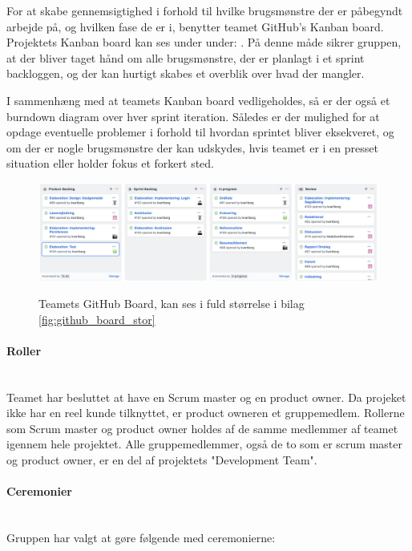 \documentclass[../../main.tex]{subfiles}
\begin{document}
For at skabe gennemsigtighed i forhold til hvilke brugsmønstre der er påbegyndt arbejde på, og hvilken fase de er i, benytter teamet GitHub's Kanban board. Projektets Kanban board kan ses under under: \cite{github}. 
På denne måde sikrer gruppen, at der bliver taget hånd om alle brugsmønstre, der er planlagt i et sprint backloggen, og der kan hurtigt skabes et overblik over hvad der mangler. 

I sammenhæng med at teamets Kanban board vedligeholdes, så er der også et burndown diagram over hver sprint iteration. Således er der mulighed for at opdage eventuelle problemer i forhold til hvordan sprintet bliver eksekveret, og om der er nogle brugsmønstre der kan udskydes, hvis teamet er i en presset situation eller holder fokus et forkert sted.
\begin{figure}[H]
  \centering
  \includegraphics[scale=.29]{figurer/kanban.png}
  \label{fig:github_board}
  \caption{Teamets GitHub Board, kan ses i fuld størrelse i bilag \ref{fig:github_board_stor}}
\end{figure}


\paragraph{Roller}  \mbox{}\\
Teamet har besluttet at have en Scrum master og en product owner. Da projeket ikke har en reel kunde tilknyttet, er product owneren et gruppemedlem. 
Rollerne som Scrum master og product owner holdes af de samme medlemmer af teamet igennem hele projektet. Alle gruppemedlemmer, også de to som er scrum master og product owner, er en del af projektets "Development Team".

\paragraph{Ceremonier} \label{Ceremonier} \mbox{}\\
Gruppen har valgt at gøre følgende med ceremonierne:
\end{document}
